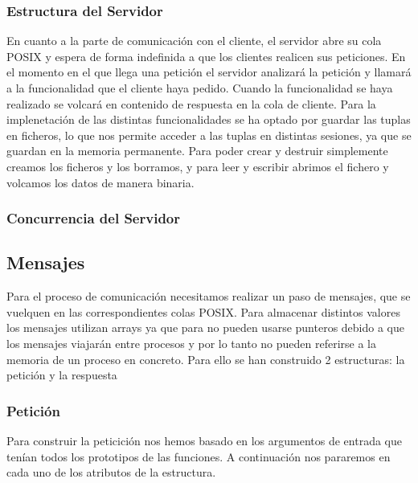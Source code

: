 \documentclass[]{article}
\begin{document}
\subsubsection{Estructura del Servidor}
\label{subsec::estructura_servidor}
En cuanto a la parte de comunicación con el cliente, el servidor abre su cola POSIX y espera de forma indefinida a que los clientes realicen sus peticiones. En el momento en el que llega una petición el servidor analizará la petición y llamará a la funcionalidad que el cliente haya pedido. Cuando la funcionalidad se haya realizado se volcará en contenido de respuesta en la cola de cliente.
Para la implenetación de las distintas funcionalidades se ha optado por guardar las tuplas en ficheros, lo que nos permite acceder a las tuplas en distintas sesiones, ya que se guardan en la memoria permanente.
Para poder crear y destruir simplemente creamos los ficheros y los borramos, y para leer y escribir abrimos el fichero y volcamos los datos de manera binaria.

\subsubsection{Concurrencia del Servidor}
\label{subsec::concurrencia_servidor}


\subsection{Mensajes}
\label{subsec:mensajes}
Para el proceso de comunicación necesitamos realizar un paso de mensajes, que se vuelquen en las correspondientes colas POSIX. Para almacenar distintos valores los mensajes utilizan arrays ya que para no pueden usarse punteros debido a que los mensajes viajarán entre procesos y por lo tanto no pueden referirse a la memoria de un proceso en concreto.
Para ello se han construido 2 estructuras: la petición y la respuesta
\subsubsection{Petición}
\label{subsec::peticion}
Para construir la peticición nos hemos basado en los argumentos de entrada que tenían todos los prototipos de las funciones. A continuación nos pararemos en cada uno de los atributos de la estructura.

\end{document}
